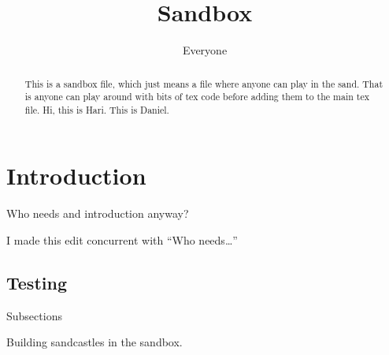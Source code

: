 \documentclass{article}
\title{Sandbox}
\author{Everyone}
\begin{document}
\maketitle

\begin{abstract}
    This is a sandbox file, which just means a file where anyone can
    play in the sand. That is anyone can play around with bits of tex
    code before adding them to the main tex file. Hi, this is
    Hari. This is Daniel.
\end{abstract}

\section{Introduction}

Who needs and introduction anyway?

I made this edit concurrent with ``Who needs\ldots''

\subsection{Testing}

Subsections

Building sandcastles in the sandbox.
\end{document}
